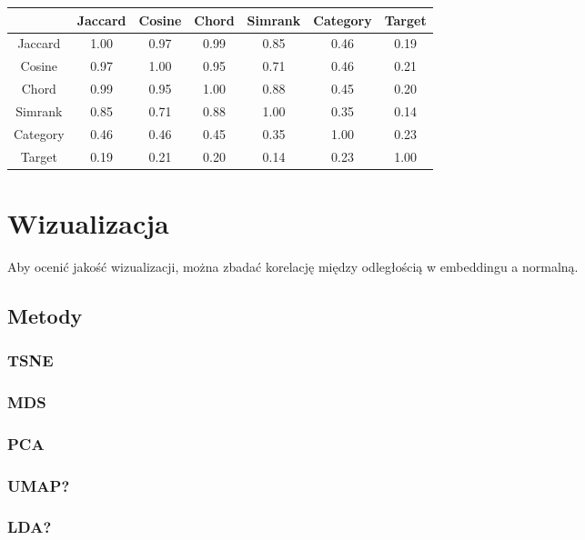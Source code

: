 \documentclass{article}
\begin{document}
\begin{center}
\begin{tabular}{|c|cccccc|}
  \hline
    & Jaccard & Cosine & Chord & Simrank & Category & Target \\
  \hline
  Jaccard & 1.00 & 0.97 & 0.99 & 0.85 & 0.46 & 0.19 \\
  Cosine & 0.97 & 1.00 & 0.95 & 0.71 & 0.46 & 0.21 \\
  Chord & 0.99 & 0.95 & 1.00 & 0.88 & 0.45 & 0.20 \\
  Simrank & 0.85 & 0.71 & 0.88 & 1.00 & 0.35 & 0.14 \\
  Category & 0.46 & 0.46 & 0.45 & 0.35 & 1.00	& 0.23 \\
  Target & 0.19 & 0.21 & 0.20 & 0.14 & 0.23	& 1.00 \\
  \hline
\end{tabular}
\end{center}

\section{Wizualizacja}

Aby ocenić jakość wizualizacji, można zbadać korelację między odległością w
embeddingu a normalną.

\subsection{Metody}

\subsubsection{TSNE}

\subsubsection{MDS}

\subsubsection{PCA}

\subsubsection{UMAP?}

\subsubsection{LDA?}
\end{document}
